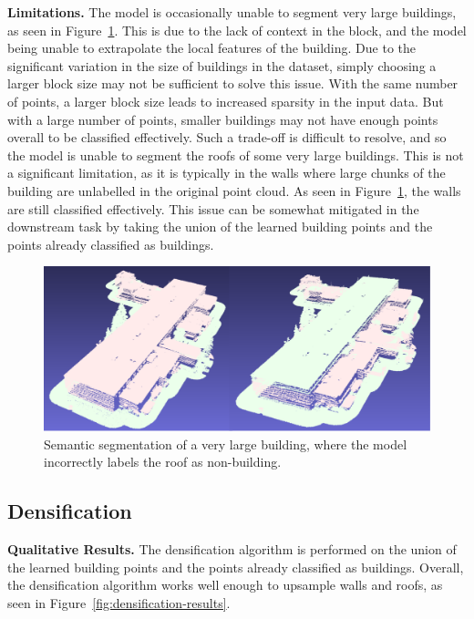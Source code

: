 \documentclass[10pt,twocolumn,letterpaper]{article}
\begin{document}
    \textbf{Limitations.} The model is occasionally unable to segment very large buildings, as seen in Figure~\ref{fig:large-building-segmentation-results}.
    This is due to the lack of context in the block, and the model being unable to extrapolate the local features of the building.
    Due to the significant variation in the size of buildings in the dataset, simply choosing a larger block size may not be sufficient to solve this issue.
    With the same number of points, a larger block size leads to increased sparsity in the input data. 
    But with a large number of points, smaller buildings may not have enough points overall to be classified effectively. 
    Such a trade-off is difficult to resolve, and so the model is unable to segment the roofs of some very large buildings.
    This is not a significant limitation, as it is typically in the walls where large chunks of the building are unlabelled in the original point cloud.
    As seen in Figure~\ref{fig:large-building-segmentation-results}, the walls are still classified effectively.
    This issue can be somewhat mitigated in the downstream task by taking the union of the learned building points and the points already classified as buildings.

    \begin{figure}
        \centering
        \includegraphics[width=\linewidth]{large_building_classification.png}
        \caption{Semantic segmentation of a very large building, where the model incorrectly labels the roof as non-building.}
        \label{fig:large-building-segmentation-results}
    \end{figure}

    \subsection{Densification}\label{subsec:densification-results}

    \textbf{Qualitative Results.} The densification algorithm is performed on the union of the learned building points and the points already classified as buildings.
    Overall, the densification algorithm works well enough to upsample walls and roofs, as seen in Figure~\ref{fig:densification-results}.
\end{document}
